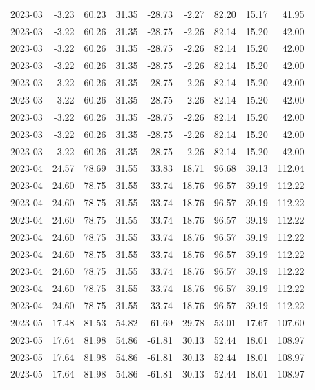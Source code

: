 \begin{table}[ht]
\begin{tabular}{lrrrrrrrr}
  2023-03 & -3.23 & 60.23 & 31.35 & -28.73 & -2.27 & 82.20 & 15.17 & 41.95 \\ 
  2023-03 & -3.22 & 60.26 & 31.35 & -28.75 & -2.26 & 82.14 & 15.20 & 42.00 \\ 
  2023-03 & -3.22 & 60.26 & 31.35 & -28.75 & -2.26 & 82.14 & 15.20 & 42.00 \\ 
  2023-03 & -3.22 & 60.26 & 31.35 & -28.75 & -2.26 & 82.14 & 15.20 & 42.00 \\ 
  2023-03 & -3.22 & 60.26 & 31.35 & -28.75 & -2.26 & 82.14 & 15.20 & 42.00 \\ 
  2023-03 & -3.22 & 60.26 & 31.35 & -28.75 & -2.26 & 82.14 & 15.20 & 42.00 \\ 
  2023-03 & -3.22 & 60.26 & 31.35 & -28.75 & -2.26 & 82.14 & 15.20 & 42.00 \\ 
  2023-03 & -3.22 & 60.26 & 31.35 & -28.75 & -2.26 & 82.14 & 15.20 & 42.00 \\ 
  2023-03 & -3.22 & 60.26 & 31.35 & -28.75 & -2.26 & 82.14 & 15.20 & 42.00 \\ 
  2023-04 & 24.57 & 78.69 & 31.55 & 33.83 & 18.71 & 96.68 & 39.13 & 112.04 \\ 
  2023-04 & 24.60 & 78.75 & 31.55 & 33.74 & 18.76 & 96.57 & 39.19 & 112.22 \\ 
  2023-04 & 24.60 & 78.75 & 31.55 & 33.74 & 18.76 & 96.57 & 39.19 & 112.22 \\ 
  2023-04 & 24.60 & 78.75 & 31.55 & 33.74 & 18.76 & 96.57 & 39.19 & 112.22 \\ 
  2023-04 & 24.60 & 78.75 & 31.55 & 33.74 & 18.76 & 96.57 & 39.19 & 112.22 \\ 
  2023-04 & 24.60 & 78.75 & 31.55 & 33.74 & 18.76 & 96.57 & 39.19 & 112.22 \\ 
  2023-04 & 24.60 & 78.75 & 31.55 & 33.74 & 18.76 & 96.57 & 39.19 & 112.22 \\ 
  2023-04 & 24.60 & 78.75 & 31.55 & 33.74 & 18.76 & 96.57 & 39.19 & 112.22 \\ 
  2023-04 & 24.60 & 78.75 & 31.55 & 33.74 & 18.76 & 96.57 & 39.19 & 112.22 \\ 
  2023-05 & 17.48 & 81.53 & 54.82 & -61.69 & 29.78 & 53.01 & 17.67 & 107.60 \\ 
  2023-05 & 17.64 & 81.98 & 54.86 & -61.81 & 30.13 & 52.44 & 18.01 & 108.97 \\ 
  2023-05 & 17.64 & 81.98 & 54.86 & -61.81 & 30.13 & 52.44 & 18.01 & 108.97 \\ 
  2023-05 & 17.64 & 81.98 & 54.86 & -61.81 & 30.13 & 52.44 & 18.01 & 108.97 \\ 

\end{tabular}
\end{table}
